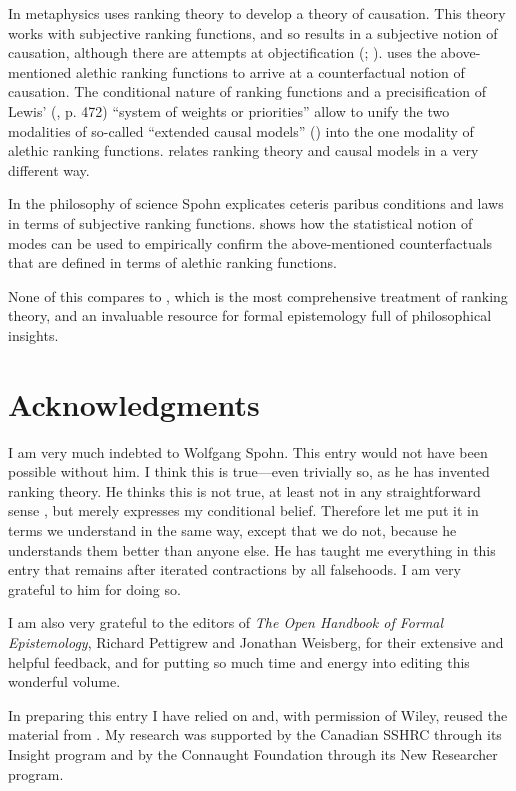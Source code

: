 In metaphysics \citet{s83, s06b} uses ranking theory to develop a theory of causation. This theory works with subjective ranking functions, and so results in a subjective notion of causation, although there are attempts at objectification (\citealp{s93}; \citealp[chapter 15]{s12}). \citet{h11} uses the above-mentioned alethic ranking functions to arrive at a counterfactual notion of causation. The conditional nature of ranking functions and a precisification of Lewis' (, p. 472) ``system of weights or priorities'' allow \citet{h13a} to unify the two modalities of so-called ``extended causal models'' (\citealt{h08,hh10}) into the one modality of alethic ranking functions. \citet{s10b} relates ranking theory and causal models in a very different way.

In the philosophy of science Spohn explicates ceteris paribus conditions \citep{s02, s14} and laws \citep{s05} in terms of subjective ranking functions. \citet{h15b} shows how the statistical notion of modes can be used to empirically confirm the above-mentioned counterfactuals that are defined in terms of alethic ranking functions.

None of this compares to \citet{s12}, which is the most comprehensive treatment of ranking theory, and an invaluable resource for formal epistemology full of philosophical insights.


\section*{Acknowledgments}

I am very much indebted to Wolfgang Spohn. This entry would not have been possible without him. I think this is true---even trivially so, as he has invented ranking theory. He thinks this is not true, at least not in any straightforward sense \citep[section 8]{s15}, but merely expresses my conditional belief. Therefore let me put it in terms we understand in the same way, except that we do not, because he understands them better than anyone else. He has taught me everything in this entry that remains after iterated contractions by all falsehoods. I am very grateful to him for doing so.

I am also very grateful to the editors of \emph{The Open Handbook of Formal Epistemology}, Richard Pettigrew and Jonathan Weisberg, for their extensive and helpful feedback, and for putting so much time and energy into editing this wonderful volume.

In preparing this entry I have relied on and, with permission of Wiley, reused the material from \citet{h13b, h13c}. My research was supported by the Canadian SSHRC through its Insight program and by the Connaught Foundation through its New Researcher program.